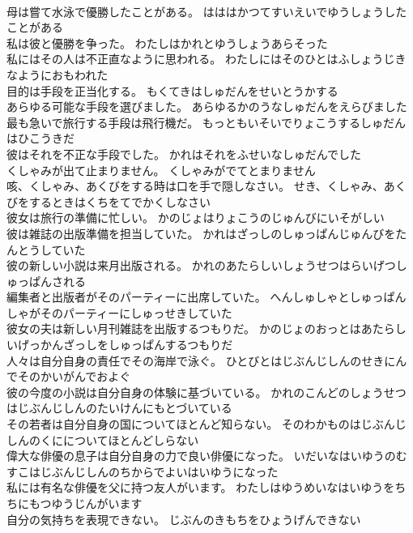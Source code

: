 \documentclass[8pt]{extreport}
\begin{document}
\begin{CJK}{UTF8}{min}
\\	母は嘗て水泳で優勝したことがある。	はははかつてすいえいでゆうしょうしたことがある 
\\	私は彼と優勝を争った。	わたしはかれとゆうしょうあらそった 
\\	私にはその人は不正直なように思われる。	わたしにはそのひとはふしょうじきなようにおもわれた 
\\	目的は手段を正当化する。	もくてきはしゅだんをせいとうかする 
\\	あらゆる可能な手段を選びました。	あらゆるかのうなしゅだんをえらびました 
\\	最も急いで旅行する手段は飛行機だ。	もっともいそいでりょこうするしゅだんはひこうきだ 
\\	彼はそれを不正な手段でした。	かれはそれをふせいなしゅだんでした 
\\	くしゃみが出て止まりません。	くしゃみがでてとまりません 
\\	咳、くしゃみ、あくびをする時は口を手で隠しなさい。	せき、くしゃみ、あくびをするときはくちをてでかくしなさい 
\\	彼女は旅行の準備に忙しい。	かのじょはりょこうのじゅんびにいそがしい 
\\	彼は雑誌の出版準備を担当していた。	かれはざっしのしゅっぱんじゅんびをたんとうしていた 
\\	彼の新しい小説は来月出版される。	かれのあたらしいしょうせつはらいげつしゅっぱんされる 
\\	編集者と出版者がそのパーティーに出席していた。	へんしゅしゃとしゅっぱんしゃがそのパーティーにしゅっせきしていた 
\\	彼女の夫は新しい月刊雑誌を出版するつもりだ。	かのじょのおっとはあたらしいげっかんざっしをしゅっぱんするつもりだ 
\\	人々は自分自身の責任でその海岸で泳ぐ。	ひとびとはじぶんじしんのせきにんでそのかいがんでおよぐ 
\\	彼の今度の小説は自分自身の体験に基づいている。	かれのこんどのしょうせつはじぶんじしんのたいけんにもとづいている 
\\	その若者は自分自身の国についてほとんど知らない。	そのわかものはじぶんじしんのくにについてほとんどしらない 
\\	偉大な俳優の息子は自分自身の力で良い俳優になった。	いだいなはいゆうのむすこはじぶんじしんのちからでよいはいゆうになった 
\\	私には有名な俳優を父に持つ友人がいます。	わたしはゆうめいなはいゆうをちちにもつゆうじんがいます 
\\	自分の気持ちを表現できない。	じぶんのきもちをひょうげんできない 

\end{CJK}
\end{document}
